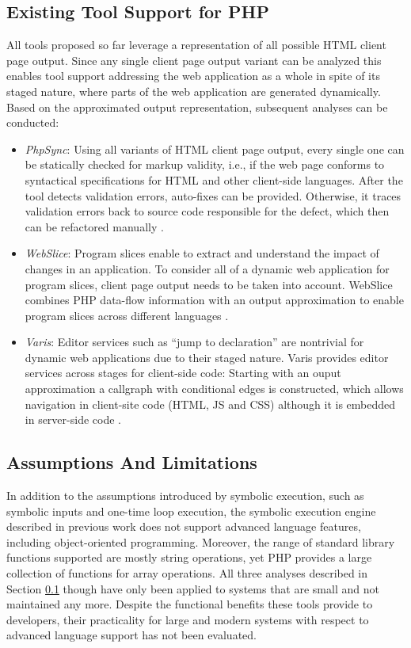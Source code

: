 \documentclass[sigconf]{acmart}
\begin{document}
\subsection{Existing Tool Support for PHP}\label{sec:existing_tools}
All tools proposed so far leverage a representation of all possible HTML client
page output. Since any single client page output variant can be analyzed this
enables tool support addressing the web application as a whole in spite of its
staged nature, where parts of the web application are
generated dynamically.
Based on the approximated output representation, subsequent analyses can be
conducted:
\begin{itemize}
	\item \emph{PhpSync}: Using all variants of  HTML client page output, every
	single one can be statically checked for markup validity, i.e., if the web page
	conforms to syntactical specifications for HTML and other client-side
	languages. After the tool detects validation errors, auto-fixes
	can be provided. Otherwise, it traces validation errors back to
	source code responsible for the defect, which then can be refactored manually
	\cite{Nguyen:2011:AFH:2190078.2190142}. 

	\item \emph{WebSlice}: Program slices enable to extract and understand the
	impact of changes in an application. To consider all of a dynamic web
	application for program slices, client page output needs to be taken into
	account. WebSlice combines PHP data-flow information with an output
	approximation to enable program slices across different languages
	\cite{Nguyen:2015:CPS:2786805.2786872}.

	\item \emph{Varis}: Editor services such as “jump to declaration” are
	nontrivial for dynamic web applications due to their staged nature. Varis
	provides editor services across stages for client-side code: Starting with an
	ouput approximation a callgraph with conditional edges is constructed, which
	allows navigation in client-site code (HTML, JS and CSS) although it is
	embedded in server-side code
	\cite{Nguyen:2015:VIS:2819009.2819140,Nguyen:2014:BCG:2635868.2635928}.
\end{itemize}

\subsection{Assumptions And Limitations}\label{sec:limitations}
In addition to the assumptions introduced by symbolic execution, such as
symbolic inputs and one-time loop execution, the symbolic execution
engine described in previous work \cite{Nguyen:2014:BCG:2635868.2635928} does
not support advanced language features, including object-oriented programming. Moreover, the range of
standard library functions supported are mostly string operations, yet PHP
provides a large collection of functions for array operations.
All three analyses described in Section \ref{sec:existing_tools} though have
only been applied to systems that are small and not maintained any more. Despite the
functional benefits these tools provide to developers, their practicality for
large and modern systems with respect to advanced language support has not been
evaluated.
\end{document}
